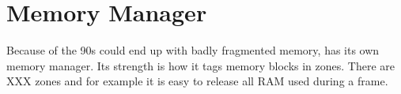 \section{Memory Manager}
Because  of the 90s could end up with badly fragmented memory, \doom has its own memory manager. Its strength is how it tags memory blocks in zones. There are XXX zones and for example it is easy to release all RAM used during a frame.\\
\par
{}